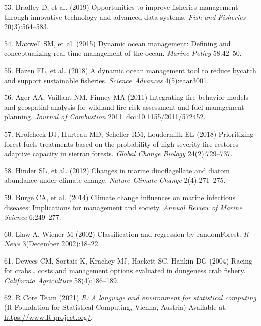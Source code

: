 \documentclass[9pt,twocolumn,twoside,lineno]{pnas-new}
\begin{document}
\leavevmode\hypertarget{ref-Bradley2019}{}%
53. Bradley D, et al. (2019) Opportunities to improve fisheries
management through innovative technology and advanced data systems.
\emph{Fish and Fisheries} 20(3):564--583.

\leavevmode\hypertarget{ref-Maxwell2015}{}%
54. Maxwell SM, et al. (2015) Dynamic ocean management: Defining and
conceptualizing real-time management of the ocean. \emph{Marine Policy}
58:42--50.

\leavevmode\hypertarget{ref-Kohin2018}{}%
55. Hazen EL, et al. (2018) A dynamic ocean management tool to reduce
bycatch and support sustainable fisheries. \emph{Science Advances}
4(5):eaar3001.

\leavevmode\hypertarget{ref-Ager2011}{}%
56. Ager AA, Vaillant NM, Finney MA (2011) Integrating fire behavior
models and geospatial analysis for wildland fire risk assessment and
fuel management planning. \emph{Journal of Combustion} 2011.
doi:\href{https://doi.org/10.1155/2011/572452}{10.1155/2011/572452}.

\leavevmode\hypertarget{ref-Krofcheck2018}{}%
57. Krofcheck DJ, Hurteau MD, Scheller RM, Loudermilk EL (2018)
Prioritizing forest fuels treatments based on the probability of
high-severity fire restores adaptive capacity in sierran forests.
\emph{Global Change Biology} 24(2):729--737.

\leavevmode\hypertarget{ref-Hinder2012}{}%
58. Hinder SL, et al. (2012) Changes in marine dinoflagellate and diatom
abundance under climate change. \emph{Nature Climate Change}
2(4):271--275.

\leavevmode\hypertarget{ref-Burge2014}{}%
59. Burge CA, et al. (2014) Climate change influences on marine
infectious diseases: Implications for management and society.
\emph{Annual Review of Marine Science} 6:249--277.

\leavevmode\hypertarget{ref-Wiener2003}{}%
60. Liaw A, Wiener M (2002) Classification and regression by
randomForest. \emph{R News} 3(December 2002):18--22.

\leavevmode\hypertarget{ref-Dewees2004}{}%
61. Dewees CM, Sortais K, Krachey MJ, Hackett SC, Hankin DG (2004)
Racing for crabs\ldots{} costs and management options evaluated in
dungeness crab fishery. \emph{California Agriculture} 58(4):186--189.

\leavevmode\hypertarget{ref-RCoreTeam2021}{}%
62. R Core Team (2021) \emph{R: A language and environment for
statistical computing} (R Foundation for Statistical Computing, Vienna,
Austria) Available at: \url{https://www.R-project.org/}.



% 
\end{document}
